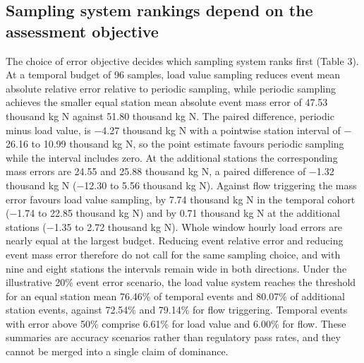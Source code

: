 \documentclass[lineno,pdflatex,sn-apa]{sn-jnl}%
\theoremstyle{thmstyleone}%
\theoremstyle{thmstyletwo}%
\theoremstyle{thmstylethree}%
\begin{document}
\subsection{Sampling system rankings depend on the assessment objective}

The choice of error objective decides which sampling system ranks first (Table 3). At a temporal budget of 96 samples, load value sampling reduces event mean absolute relative error relative to periodic sampling, while periodic sampling achieves the smaller equal station mean absolute event mass error of 47.53 thousand kg N against 51.80 thousand kg N. The paired difference, periodic minus load value, is $-$4.27 thousand kg N with a pointwise station interval of $-$26.16 to 10.99 thousand kg N, so the point estimate favours periodic sampling while the interval includes zero. At the additional stations the corresponding mass errors are 24.55 and 25.88 thousand kg N, a paired difference of $-$1.32 thousand kg N ($-$12.30 to 5.56 thousand kg N). Against flow triggering the mass error favours load value sampling, by 7.74 thousand kg N in the temporal cohort ($-$1.74 to 22.85 thousand kg N) and by 0.71 thousand kg N at the additional stations ($-$1.35 to 2.72 thousand kg N). Whole window hourly load errors are nearly equal at the largest budget. Reducing event relative error and reducing event mass error therefore do not call for the same sampling choice, and with nine and eight stations the intervals remain wide in both directions. Under the illustrative 20\% event error scenario, the load value system reaches the threshold for an equal station mean 76.46\% of temporal events and 80.07\% of additional station events, against 72.54\% and 79.14\% for flow triggering. Temporal events with error above 50\% comprise 6.61\% for load value and 6.00\% for flow. These summaries are accuracy scenarios rather than regulatory pass rates, and they cannot be merged into a single claim of dominance.
\end{document}
